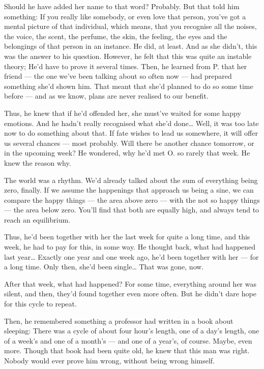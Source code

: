 Should he have added her name to that word?
Probably. But that told him something: If you really like somebody, or even love that person, you've got a mental picture of that individual, which means, that you recognise all the noises, the voice, the scent, the perfume, the skin, the feeling, the eyes and the belongings of that person in an instance. 
He did, at least. 
And as she didn't, this was the answer to his question. 
However, he felt that this was quite an instable theory; He'd have to prove it several times. 
Then, he learned from P. that her friend --- the one we've been talking about so often now --- had prepared something she'd shown him. That meant that she'd planned to do so some time before --- and as we know, plans are never realised to our benefit.

Thus, he knew that if he'd offended her, she must've waited for some happy emotions. And he hadn't really recognised what she'd done\dots{}
Well, it was too late now to do something about that. If fate wishes to lead us somewhere, it will offer us several chances --- most probably. 
Will there be another chance tomorrow, or in the upcoming week?
He wondered, why he'd met O. so rarely that week. 
He knew the reason why.

The world was a rhythm. 
We'd already talked about the sum of everything being zero, finally. If we assume the happenings that approach us being a sine, we can compare the happy things --- the area above zero --- with the not so happy things --- the area below zero. 
You'll find that both are equally high, and always tend to reach an equilibrium. 

Thus, he'd been together with her the last week for quite a long time, and this week, he had to pay for this, in some way. He thought back, what had happened last year\dots{}
Exactly one year and one week ago, he'd been together with her --- for a long time. Only then, she'd been single\dots{}
That was gone, now.

After that week, what had happened?
For some time, everything around her was silent, and then, they'd found together even more often. 
But he didn't dare hope for this cycle to repeat.

Then, he remembered something a professor had written in a book about sleeping: There was a cycle of about four hour's length, one of a day's length, one of a week's and one of a month's --- and one of a year's, of course. 
Maybe, even more. 
Though that book had been quite old, he knew that this man was right. 
Nobody would ever prove him wrong, without being wrong himself.

